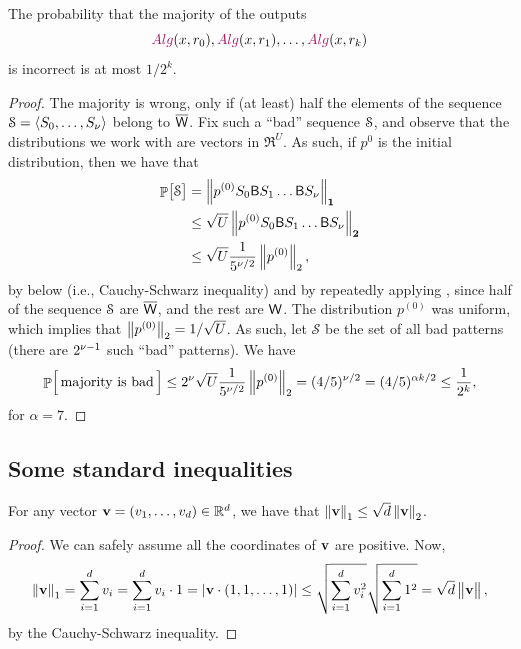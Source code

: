 \begin{theorem}
    The probability that the majority of the outputs
    \[
    \Alg(x,r_0), \Alg(x,r_1), \ldots, \Alg(x,r_k)
    \]
    is incorrect is at most $1/2^k$.
\end{theorem}
\begin{proof}
    The majority is wrong, only if (at least) half the elements of the
    sequence $\EuScript{S} = \left\langle {S_0, \ldots, S_\nu} \right\rangle$ belong to
    $\overline{\mathsf{W}}$. Fix such a ``bad'' sequence $\EuScript{S}$, and observe
    that the distributions we work with are vectors in $\Re^U$. As
    such, if $p^{0}$ is the initial distribution, then we have that
    \begin{align*}
        \Prob{\bigl. \Sequence}%
        &=%
        \norm{p^{(0)} S_0 \BMtrx S_1 \ldots \BMtrx S_\altK}_{\mathbf{1}
           }%
      \\&\leq%
        \sqrt{U} \norm{p^{(0)} S_0 \BMtrx S_1 \ldots \BMtrx
           S_\altK}_{\mathbf{2}}
      \\&\leq%
        \sqrt{U}\frac{1}{5^{\altK/2}} \norm{p^{(0)}}_2,
    \end{align*}
    by  below (i.e., Cauchy-Schwarz inequality) and
    by repeatedly applying , since half of the
    sequence $\EuScript{S}$ are $\overline{\mathsf{W}}$, and the rest are $\mathsf{W}$.
    The distribution $p^{(0)}$ was uniform, which implies that
    $\left\| {p^{(0)} } \right\|_2 = 1/\sqrt{U}$. As such, let $\mathcal{S}$ be
    the set of all bad patterns (there are $2^{\nu-1}$ such ``bad''
    patterns).  We have
    \begin{equation*}
        \Prob{\Bigl.\, \text{majority is bad}\, }%
        \leq%
        2^\altK \sqrt{U} \frac{1}{5^{\altK/2}} \norm{p^{(0)}}_2%
        =%
        (4/5)^{\altK/2} = (4/5)^{\alpha k/2} \leq \frac{1}{2^k},
    \end{equation*}
    for $\alpha = 7$.
\end{proof}


\subsection{Some standard inequalities}

\begin{lemma}
    For any vector $\vecA = \pth[]{v_1,\ldots, v_d} \in \Re^d$, we
    have that $\left\| {\mathbf{v}} \right\|_1 \leq \sqrt{d} \left\| {\mathbf{v}} \right\|_2$.
\end{lemma}

\begin{proof}
    We can safely assume all the coordinates of $\mathbf{v}$ are positive.
    Now, 
    \begin{equation*}
        \norm{\vecA}_1%
        =%
        \sum_{i=1}^d {v_i}%
        =%
        \sum_{i=1}^d {v_i} \cdot 1 %
        =%
        \cardin{\dotprod{\vecA}{(1,1, \ldots, 1)}} \leq%
        \sqrt{\sum_{i=1}^d v_i^2 } \sqrt{\sum_{i=1}^d 1^2}%
        =%
        \sqrt{d} \norm{\bigl.\vecA},
    \end{equation*}
    by the Cauchy-Schwarz inequality.
\end{proof}


